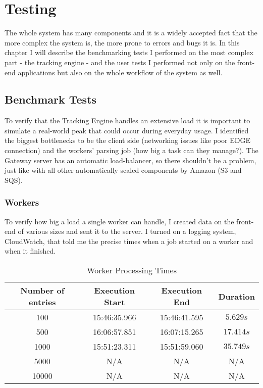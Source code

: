 \chapter{Testing}

The whole system has many components and it is a widely accepted fact that the more complex the system is, the more prone to errors and bugs it is. In this chapter I will describe the benchmarking tests I performed on the most complex part - the tracking engine - and the user tests I performed not only on the front-end applications but also on the whole workflow of the system as well.

\section{Benchmark Tests}

To verify that the Tracking Engine handles an extensive load it is important to simulate a real-world peak that could occur during everyday usage. I identified the biggest bottlenecks to be the client side (networking issues like poor EDGE connection) and the workers' parsing job (how big a task can they manage?). The Gateway server has an automatic load-balancer, so there shouldn't be a problem, just like with all other automatically scaled components by Amazon (S3 and SQS).

\subsection{Workers}

To verify how big a load a single worker can handle, I created data on the front-end of various sizes and sent it to the server. I turned on a logging system, CloudWatch, that told me the precise times when a job started on a worker and when it finished.

\begin{table}[!ht]
\begin{center}
\begin{tabular}{|c|c|c|c|}
\hline
\textbf{Number of entries} & \textbf{Execution Start} & \textbf{Execution End} & \textbf{Duration} \\
\hline
100 & 15:46:35.966 & 15:46:41.595 & $5.629s$ \\
\hline
500 & 16:06:57.851 & 16:07:15.265 & $17.414s$ \\
\hline
1000 & 15:51:23.311 & 15:51:59.060 & $35.749s$ \\
\hline
5000 & N/A & N/A & N/A \\
\hline
10000 & N/A & N/A & N/A \\
\hline
\end{tabular}
\end{center}
\caption{Worker Processing Times}
\label{tab:table_worker}
\end{table}

